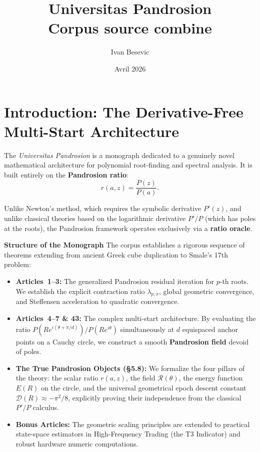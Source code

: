 \documentclass[10pt,a4paper,oneside]{book}
\title{Universitas Pandrosion\\Corpus source combine}
\author{Ivan Besevic}
\date{Avril 2026}
\theoremstyle{definition}
\theoremstyle{remark}
\begin{document}
\frontmatter
\maketitle
\tableofcontents
\mainmatter

\chapter*{Introduction: The Derivative-Free Multi-Start Architecture}

The \emph{Universitas Pandrosion} is a monograph dedicated to a genuinely novel mathematical architecture for polynomial root-finding and spectral analysis. It is built entirely on the \textbf{Pandrosion ratio}:
\[
r(a, z) = \frac{P(z)}{P(a)}.
\]

Unlike Newton's method, which requires the symbolic derivative $P'(z)$, and unlike classical theories based on the logarithmic derivative $P'/P$ (which has poles at the roots), the Pandrosion framework operates exclusively via a \textbf{ratio oracle}.

\medskip

\textbf{Structure of the Monograph}\quad
The corpus establishes a rigorous sequence of theorems extending from ancient Greek cube duplication to Smale's 17th problem:
\begin{itemize}
  \item \textbf{Articles~1--3:} The generalized Pandrosion residual iteration for $p$-th roots. We establish the explicit contraction ratio $\lambda_{p,x}$, global geometric convergence, and Steffensen acceleration to quadratic convergence.
  \item \textbf{Articles~4--7 \& 43:} The complex multi-start architecture. By evaluating the ratio $P(Re^{i(\theta+\pi/d)})/P(Re^{i\theta})$ simultaneously at $d$ equispaced anchor points on a Cauchy circle, we construct a smooth \textbf{Pandrosion field} devoid of poles. 
  \item \textbf{The True Pandrosion Objects (\S 5.8):} We formalize the four pillars of the theory: the scalar ratio $r(a,z)$, the field $\mathcal{R}(\theta)$, the energy function $E(R)$ on the circle, and the universal geometrical epoch descent constant $\mathcal{D}(R) \approx -\pi^2/8$, explicitly proving their independence from the classical $P'/P$ calculus.
  \item \textbf{Bonus Articles:} The geometric scaling principles are extended to practical state-space estimators in High-Frequency Trading (the T3 Indicator) and robust hardware numeric computations.
\end{itemize}
\end{document}
